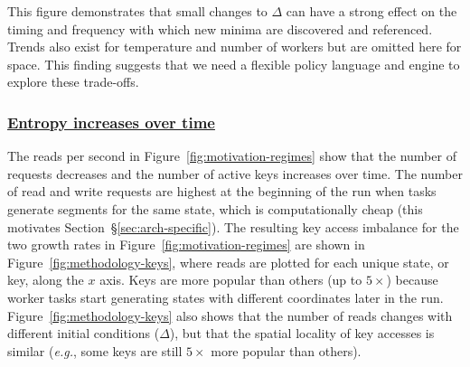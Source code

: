This figure demonstrates that small changes to \(\Delta\) can have a strong
effect on the timing and frequency with which new minima are discovered and
referenced.  Trends also exist for temperature and number of workers but are
omitted here for space.  This finding suggests that we need a flexible policy
language and engine to explore these trade-offs.  

\subsubsection{\underline{Entropy increases over time}} The reads per second in
Figure~\ref{fig:motivation-regimes} show that the number of requests decreases
and the number of active keys increases over time.  The number of read and
write requests are highest at the beginning of the run when tasks generate
segments for the same state, which is computationally cheap (this motivates
Section~\S\ref{sec:arch-specific}).  The resulting key access imbalance for the
two growth rates in Figure~\ref{fig:motivation-regimes} are shown in
Figure~\ref{fig:methodology-keys}, where reads are plotted for each unique
state, or key, along the \(x\) axis. Keys are more popular than others (up to
\(5\times\)) because worker tasks start generating states with different
coordinates later in the run.  Figure~\ref{fig:methodology-keys} also shows that the
number of reads changes with different initial conditions (\(\Delta\)), but
that the spatial locality of key accesses is similar ({\it e.g.}, some keys are
still \(5\times\) more popular than others).
